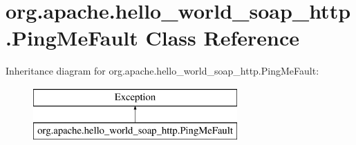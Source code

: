 \hypertarget{classorg_1_1apache_1_1hello__world__soap__http_1_1_ping_me_fault}{}\section{org.\+apache.\+hello\+\_\+world\+\_\+soap\+\_\+http.\+Ping\+Me\+Fault Class Reference}
\label{classorg_1_1apache_1_1hello__world__soap__http_1_1_ping_me_fault}
Inheritance diagram for org.\+apache.\+hello\+\_\+world\+\_\+soap\+\_\+http.\+Ping\+Me\+Fault\+:\begin{figure}[H]
\begin{center}
\leavevmode
\includegraphics[height=2.000000cm]{classorg_1_1apache_1_1hello__world__soap__http_1_1_ping_me_fault}
\end{center}
\end{figure}
